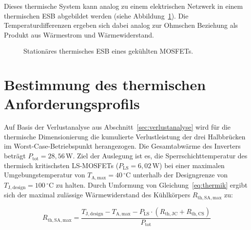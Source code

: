 Dieses thermische System kann analog zu einem elektrischen Netzwerk in einem thermischen ESB abgebildet werden (siehe Abbildung~\ref{fig:thermal_esb}). Die Temperaturdifferenzen ergeben sich dabei analog zur Ohmschen Beziehung als Produkt aus Wärmestrom und Wärmewiderstand.

\begin{figure}[htbp] 
    \centering 
    \caption{Stationäres thermisches ESB eines gekühlten MOSFETs.} 
    \label{fig:thermal_esb} 
\end{figure}

\section{Bestimmung des thermischen Anforderungsprofils}
\label{sec:thermik_anforderung}

Auf Basis der Verlustanalyse aus Abschnitt~\ref{sec:verlustanalyse} wird für die thermische Dimensionierung die kumulierte Verlustleistung der drei Halbbrücken im Worst-Case-Betriebspunkt herangezogen. Die Gesamtabwärme des Inverters beträgt $P_{\mathrm{tot}} = 28{,}56\,\mathrm{W}$.
Ziel der Auslegung ist es, die Sperrschichttemperatur des thermisch kritischsten LS-MOSFETs ($P_{\mathrm{LS}} = 6{,}02\,\mathrm{W}$) bei einer maximalen Umgebungstemperatur von $T_{\mathrm{A,max}} = 40\,^{\circ}\mathrm{C}$ unterhalb der Designgrenze von $T_{\mathrm{J,design}} = 100\,^{\circ}\mathrm{C}$ zu halten. Durch Umformung von Gleichung~\eqref{eq:thermik} ergibt sich der maximal zulässige Wärmewiderstand des Kühlkörpers $R_{\mathrm{th,SA,max}}$ zu:

\begin{equation}
    R_{\mathrm{th,SA,max}} = \frac{T_{\mathrm{J,design}} - T_{\mathrm{A,max}} - P_{\mathrm{LS}} \cdot (R_{\mathrm{th,JC}} + R_{\mathrm{th,CS}})}{P_{\mathrm{tot}}}
\end{equation}


